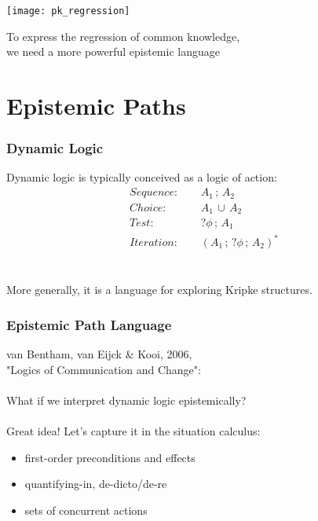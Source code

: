 \documentclass[compress]{beamer}
\begin{document}
\begin{frame}
\begin{center}
  \texttt{[image: pk\_regression]}
\end{center}
\end{frame}

\begin{frame}
\centering To express the regression of common knowledge,\\
we need a more powerful epistemic language \\
\end{frame}

\section{Epistemic Paths}

\begin{frame}
\frametitle{Dynamic Logic}
Dynamic logic is typically conceived as a logic of action:
\begin{align*}
Sequence: & \,\,\,\,\,\,\, A_1\,;\,A_2 \\
Choice: & \,\,\,\,\,\,\, A_1\,\cup\,A_2 \\
Test: & \,\,\,\,\,\,\, ?\phi\,;\,A_1 \\
Iteration: &  \,\,\,\,\,\,\, (A_1\,;\,?\phi\,;\,A_2)^*
\end{align*}
\ \\
\ \\
\pause
More generally, it is a language for exploring Kripke structures.
\end{frame}

\begin{frame}
\frametitle{Epistemic Path Language}
van Bentham, van Eijck \& Kooi, 2006,\\
"Logics of Communication and Change":
\ \\
\ \\
What if we interpret dynamic logic epistemically?
\ \\
\ \\
\pause
Great idea!  Let's capture it in the situation calculus:
\begin{itemize}
\item first-order preconditions and effects
\item quantifying-in, de-dicto/de-re
\item sets of concurrent actions
\end{itemize}
\end{frame}
\end{document}
